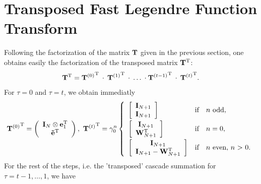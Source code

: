 \section{Transposed Fast Legendre Function Transform}
\label{NFSFT:transposedFLFT}
Following the factorization of the matrix $\mathbf{T}$ given in the previous section, one obtains easily the factorization of the transposed matrix $\mathbf{T^{\text{\rm{T}}}}$:
\begin{equation}
  \label{NFSFT:transposedFactorization}
  \mathbf{T}^{\text{\rm{T}}} = {\mathbf{T}^{(0)}}^{\text{\rm{T}}} \: \cdot \: {\mathbf{T}^{(1)}}^{\text{\rm{T}}} \: \cdot \: \ldots \: \cdot {\mathbf{T}^{(t-1)}}^{\text{\rm{T}}} \: \cdot \: {\mathbf{T}^{(t)}}^{\text{\rm{T}}}.
\end{equation}
For $\tau = 0$ and $\tau = t$, we obtain immediatly
\[
  {\V{T}^{(0)}}^{\transp} = 
     \left(\begin{array}{c} 
       \V{I}_{N} \otimes \V{e}_{1}^{\transp}\\ 
       \V{\tilde{e}}^{\transp} 
     \end{array}\right),\  
   {\V{T}^{(t)}}^{\transp} = \gamma_{0}^n 
     \left\{\begin{array}{l@{\quad \text{if} \quad}l} 
       \left[ \begin{array}{c} \V{I}_{N+1} \\ \V{I}_{N+1}                         \end{array} \right] & \text{$n$ odd},          \\[2ex]
       \left[ \begin{array}{c} \V{I}_{N+1} \\               \V{W}_{N+1}^{\transp} \end{array} \right] & \text{$n = 0$},          \\[2ex]
       \left[ \begin{array}{c} \V{I}_{N+1} \\ \V{I}_{N+1} - \V{W}_{N+1}^{\transp} \end{array} \right] & \text{$n$ even, $n$ > 0}.
     \end{array}\right.
\]
For the rest of the steps, i.e. the 'transposed' cascade summation for $\tau = t-1,\ldots,1$, we have
